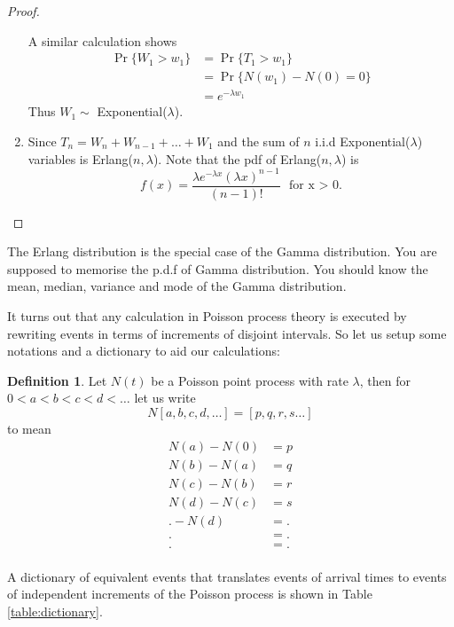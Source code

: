 \documentclass[letterpaper, 12pt]{article}
\newcommand{\1}{\mathds{1}} %
\theoremstyle{definition}
\newtheorem{definition}[theorem]{Definition}
\begin{document}
\begin{proof}
\begin{enumerate}
A similar calculation shows 
\begin{align*}
\Pr\{W_1 > w_1\} &= \Pr\{T_1 > w_1\}\\
&= \Pr\{ N(w_1)-N(0)=0\}\\
&= e^{-\lambda w_1}
\end{align*}
Thus $W_1\sim$ Exponential($\lambda$).

\item Since $T_n = W_n+W_{n-1}+\ldots+W_1$ and the sum of $n$ i.i.d Exponential($\lambda$) variables is Erlang($n,\lambda$). Note that the pdf of Erlang($n,\lambda$) is 
\[f(x) = \dfrac{\lambda e^{-\lambda x} (\lambda x)^{n-1}}{(n-1)!} \,\, \text{ for x > 0}.\]
\end{enumerate}
\end{proof}
The Erlang distribution is the special case of the Gamma distribution. You are supposed to memorise the p.d.f of Gamma distribution. You should know the mean, median, variance and mode of the Gamma distribution.

It turns out that any calculation in Poisson process theory is executed by rewriting events in terms of increments of disjoint intervals. So let us setup some notations and a dictionary to aid our calculations:

\begin{definition}
    \label{defn:incrementnotation}
    Let $N(t)$ be a Poisson point process with rate $\lambda$, then for $0 < a < b < c < d < \ldots$ let us write \[ N[a,b,c,d,\ldots] = [p,q,r,s\ldots]\] to mean \begin{align*}
                              N(a)-N(0)&=p\\
                              N(b)-N(a)&=q\\
                              N(c)-N(b)&=r\\
                              N(d)-N(c)&=s\\
                              .-N(d)&=.\\
                              .&=.\\
                              .&=.\\\end{align*}
\end{definition}

A dictionary of equivalent events that translates events of arrival times to events of independent increments of the Poisson process is shown in Table \ref{table:dictionary}.
\end{document}
